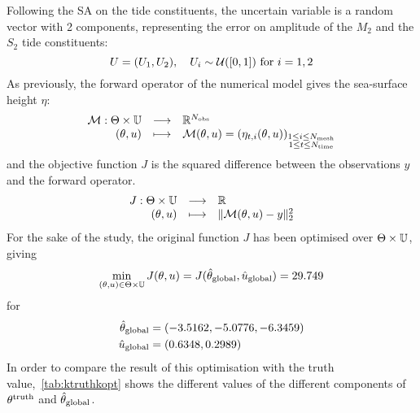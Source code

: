 \documentclass[../../Main_ManuscritThese.tex]{subfiles}
\begin{document}
Following the SA on the tide constituents, the uncertain variable is a
random vector with \num{2} components, representing the error on
amplitude of the $M_2$ and the $S_2$ tide constituents:
\begin{equation}
  \UU = (\UU_1,\UU_2), \quad \UU_i \sim \mathcal{U}(\interval{0}{1}) \text{ for } i=1,2
\end{equation}
As previously, the forward operator of the numerical model gives the sea-surface height $\eta$:
\begin{equation}
  \begin{array}{rcl}
    \mathcal{M}: \Kspace \times \Uspace &\longrightarrow& \mathbb{R}^{N_{\mathrm{obs}}} \\
    (\kk, \uu)& \longmapsto & \mathcal{M}(\kk, \uu) = \left(\eta_{t,i}(\kk, \uu)\right)_{\substack{1 \leq i \leq N_{\mathrm{mesh}} \\ 1 \leq t \leq N_{\mathrm{time}}}} \\ 
  \end{array}
\end{equation}
and the objective function $J$ is the squared difference between the
observations $y$ and the forward operator.
\begin{equation}
  \begin{array}{rcl}
    J: \Kspace \times \Uspace & \longrightarrow & \mathbb{R} \\
    (\kk, \uu) & \longmapsto & \|\mathcal{M}(\kk, \uu) - y \|^2_2
  \end{array}
\end{equation}
For the sake of the study, the original function $J$ has been
optimised over $\Kspace\times\Uspace$, giving
\begin{equation}
  \min_{(\kk,\uu) \in \Kspace \times \Uspace} J(\kk, \uu) = J(\hat{\kk}_{\mathrm{global}}, \hat{\uu}_{\mathrm{global}})= \num{29.749}
\end{equation}
for
\begin{align}
  \hat{\kk}_{\mathrm{global}}                     & = (\num[round-mode=places,round-precision=4]{-3.5161661} , \num[round-mode=places,round-precision=4]{-5.07764701}, \num[round-mode=places,round-precision=4]{-6.34588442})                                                                                                            \\\hat{\uu}_{\mathrm{global}} & = (\num[round-mode=places,round-precision=4]{0.6347829},\num[round-mode=places,round-precision=4]{0.29890637})
\end{align}
In order to compare the result of this optimisation with the truth
value,~\cref{tab:ktruthkopt} shows the different values of the
different components of $\kk^{\mathrm{truth}}$ and
$\hat{\kk}_{\mathrm{global}}$.
\end{document}

